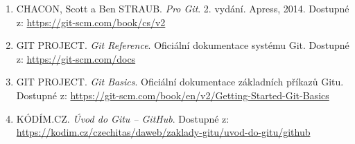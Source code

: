 \begin{enumerate}
   \item CHACON, Scott a Ben STRAUB. \textit{Pro Git}. 2. vydání. Apress, 2014. Dostupné z: \url{https://git-scm.com/book/cs/v2}
   \item GIT PROJECT. \textit{Git Reference}. Oficiální dokumentace systému Git. Dostupné z: \url{https://git-scm.com/docs}
   \item GIT PROJECT. \textit{Git Basics}. Oficiální dokumentace základních příkazů Gitu. Dostupné z: \url{https://git-scm.com/book/en/v2/Getting-Started-Git-Basics}
   \item KÓDÍM.CZ. \textit{Úvod do Gitu – GitHub}. Dostupné z: \url{https://kodim.cz/czechitas/daweb/zaklady-gitu/uvod-do-gitu/github}
\end{enumerate}

